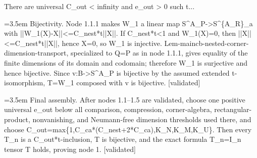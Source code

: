 \documentclass{article}
\newcommand{\step}[1]{\par\noindent\hangindent=3.5em\hangafter=1%
  \makebox[3.5em][l]{\textbf{#1.}}}
\newcommand{\steptag}[1]{\hfill{\small\textsf{[#1]}}}
\begin{document}
\begin{proofbox}{There are universal C\_out < infinity and e\_out > 0 such t...}
\step{1.5} Bijectivity. Node 1.1.1 makes W\_1 a linear map S\textasciicircum{}A\_P->S\textasciicircum{}\{A\_R\}\_a with ||W\_1(X)-X||<=C\_nest*t||X||. If C\_nest*t<1 and W\_1(X)=0, then ||X||<=C\_nest*t||X||, hence X=0, so W\_1 is injective. Lem-maincb-nested-corner-dimension-transport, specialized to Q=P as in node 1.1.1, gives equality of the finite dimensions of its domain and codomain; therefore W\_1 is surjective and hence bijective. Since v:B->S\textasciicircum{}A\_P is bijective by the assumed extended t-isomorphism, T=W\_1 composed with v is bijective. \steptag{validated} \\[4pt]
\step{1.6} Final assembly. After nodes 1.1--1.5 are validated, choose one positive universal e\_out below all comparison, compression, corner-algebra, rectangular-product, nonvanishing, and Neumann-free dimension thresholds used there, and choose C\_out=max\{1,C\_ca*(C\_nest+2*C\_ca),K\_N,K\_M,K\_U\}. Then every T\_n is a C\_out*t-inclusion, T is bijective, and the exact formula T\_n=I\_n tensor T holds, proving node 1. \steptag{validated} \\[4pt]
\end{proofbox}
\end{document}
